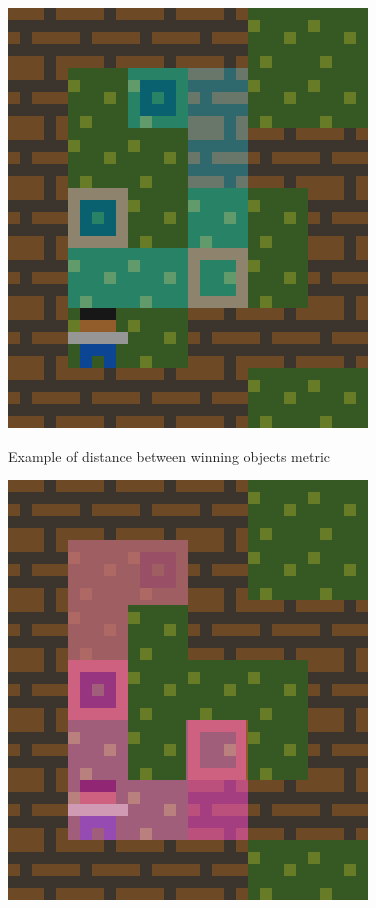 \begin{hcfigure}
	\centering
	\begin{minipage}{0.45\textwidth}
		\centering
  		\includegraphics[width=\linewidth]{Images/firstScoreBestFS}
  		\caption{Example of distance between winning objects metric}\label{Figure:bestFS1}
	\end{minipage}\hfill
	\begin{minipage}{0.45\textwidth}
		\centering
  		\includegraphics[width=\linewidth]{Images/secondScoreBestFS}

\end{minipage}
\end{hcfigure}
